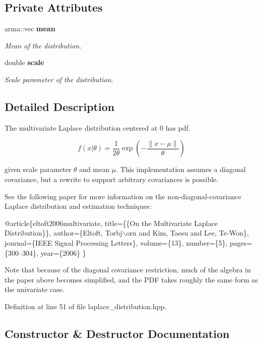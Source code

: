 \subsection*{Private Attributes}
\begin{DoxyCompactItemize}
\item 
arma\-::vec {\bf mean}
\begin{DoxyCompactList}\small\item\em Mean of the distribution. \end{DoxyCompactList}\item 
double {\bf scale}
\begin{DoxyCompactList}\small\item\em Scale parameter of the distribution. \end{DoxyCompactList}\end{DoxyCompactItemize}


\subsection{Detailed Description}
The multivariate Laplace distribution centered at 0 has pdf. 

\[ f(x|\theta) = \frac{1}{2 \theta}\exp\left(-\frac{\|x - \mu\|}{\theta}\right) \]

given scale parameter $\theta$ and mean $\mu$. This implementation assumes a diagonal covariance, but a rewrite to support arbitrary covariances is possible.

See the following paper for more information on the non-\/diagonal-\/covariance Laplace distribution and estimation techniques\-:


\begin{DoxyCode}
@article\{eltoft2006multivariate,
  title=\{\{On the Multivariate Laplace Distribution\}\},
  author=\{Eltoft, Torbj\(\backslash\)orn and Kim, Taesu and Lee, Te-Won\},
  journal=\{IEEE Signal Processing Letters\},
  volume=\{13\},
  number=\{5\},
  pages=\{300--304\},
  year=\{2006\}
\}
\end{DoxyCode}


Note that because of the diagonal covariance restriction, much of the algebra in the paper above becomes simplified, and the P\-D\-F takes roughly the same form as the univariate case. 

Definition at line 51 of file laplace\-\_\-distribution.\-hpp.



\subsection{Constructor \& Destructor Documentation}
